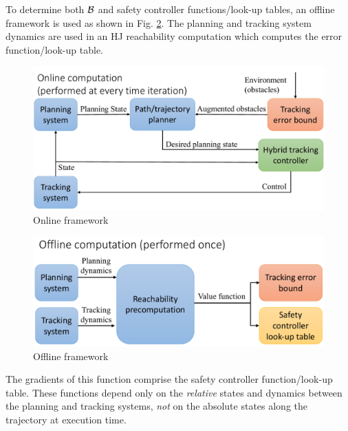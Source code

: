 To determine both $\mathcal B$ and safety controller functions/look-up tables, an offline framework is used as shown in Fig. \ref{fig:fw_offline}. The planning and tracking system dynamics are used in an HJ reachability computation which computes the error function/look-up table. 
\begin{figure}[h]
	\centering
	\includegraphics[width=0.9\columnwidth]{fig/framework_online}
	\caption{Online framework}
	\label{fig:fw_online}
	\vspace{-.1in}
	
\end{figure}
\begin{figure}[h]
	\vspace{-5mm}
	\centering
	\includegraphics[width=0.9\columnwidth]{fig/framework_offline}
	\caption{Offline framework}
	\label{fig:fw_offline}
\end{figure}
The gradients of this function comprise the safety controller function/look-up table. These functions depend only on the \textit{relative} states and dynamics between the planning and tracking systems, \textit{not} on the absolute states along the trajectory at execution time.





